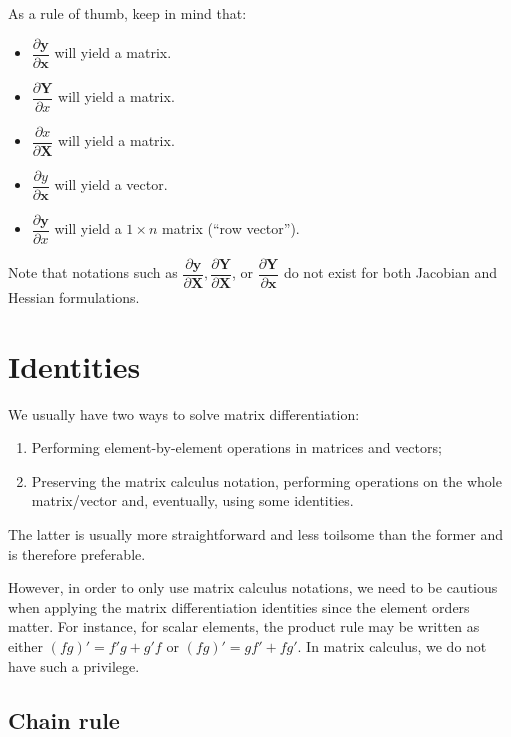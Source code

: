 \documentclass{article}
\begin{document}
As a rule of thumb, keep in mind that:
\begin{itemize}
    \item \(\dfrac{\partial \mathbf{y}}{\partial \mathbf{x}}\) will yield a matrix.
    \item \(\dfrac{\partial \mathbf{Y}}{\partial x}\) will yield a matrix.
    \item \(\dfrac{\partial x}{\partial \mathbf{X}}\) will yield a matrix.
    \item \(\dfrac{\partial y}{\partial \mathbf{x}}\) will yield a vector.
    \item \(\dfrac{\partial \mathbf{y}}{\partial x}\) will yield a \(1\times n\) matrix (``row vector'').
\end{itemize}

Note that notations such as \(\dfrac{\partial \mathbf{y}}{\partial \mathbf{X}}, \dfrac{\partial \mathbf{Y}}{\partial \mathbf{X}}\), or \(\dfrac{\partial \mathbf{Y}}{\partial \mathbf{x}}\) do not exist for both Jacobian and Hessian formulations.

\section{Identities}

We usually have two ways to solve matrix differentiation:
\begin{enumerate}
    \item Performing element-by-element operations in matrices and vectors;
    \item Preserving the matrix calculus notation, performing operations on the whole matrix/vector and, eventually, using some identities.
\end{enumerate}
The latter is usually more straightforward and less toilsome than the former and is therefore preferable.

However, in order to only use matrix calculus notations, we need to be cautious when applying the matrix differentiation identities since the element orders matter. For instance, for scalar elements, the product rule may be written as either \((fg)' = f'g + g'f\) or \((fg)' = g f' + f g'\). In matrix calculus, we do not have such a privilege.

\subsection{Chain rule}
\end{document}
